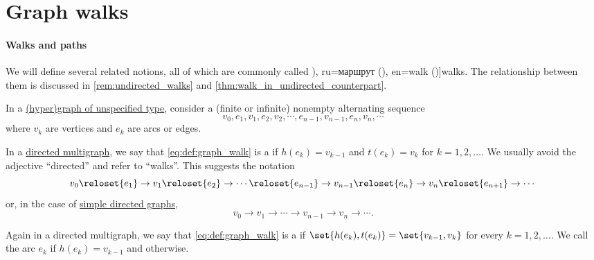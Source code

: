 \section{Graph walks}\label{sec:graph_walks}

\paragraph{Walks and paths}

\begin{definition}\label{def:graph_walk}\mimprovised
  We will define several related notions, all of which are commonly called \term[bg=маршрут (\cite[11]{Мирчев2001Графи}), ru=маршрут (\cite[23]{ЕмеличевИПр1990ТеорияГрафов}), en=walk (\cite[10]{Diestel2017GraphTheory})]{walks}. The relationship between them is discussed in \cref{rem:undirected_walks} and \cref{thm:walk_in_undirected_counterpart}.

  In a \hyperref[rem:graph_of_unspecified_type]{(hyper)graph of unspecified type}, consider a (finite or infinite) nonempty alternating sequence
  \begin{equation}\label{eq:def:graph_walk}
    v_0, e_1, v_1, e_2, v_2, \cdots, e_{n-1}, v_{n-1}, e_n, v_n, \cdots
  \end{equation}
  where \( v_k \) are vertices and \( e_k \) are arcs or edges.

  \begin{thmenum}[series=def:graph_walk]
     In a \hyperref[def:directed_multigraph]{directed multigraph}, we say that \eqref{eq:def:graph_walk} is a  if \( h(e_k) = v_{k-1} \) and \( t(e_k) = v_k \) for \( k = 1, 2, \ldots \). We usually avoid the adjective \enquote{directed} and refer to \enquote{walks}. This suggests the notation
    \begin{equation}\label{eq:def:graph_walk/directed}
      v_0 \reloset {e_1} \to v_1 \reloset {e_2} \to \cdots \reloset {e_{n-1}} \to v_{n-1} \reloset {e_n} \to v_n \reloset {e_{n+1}} \to \cdots
    \end{equation}
    or, in the case of \hyperref[def:directed_graph]{simple directed graphs},
    \begin{equation*}
      v_0 \to v_1 \to \cdots \to v_{n-1} \to v_n \to \cdots.
    \end{equation*}

     Again in a directed multigraph, we say that \eqref{eq:def:graph_walk} is a  if \( \set{ h(e_k), t(e_k) } = \set{ v_{k-1}, v_k } \) for every \( k = 1, 2, \ldots \). We call the arc \( e_k \)  if \( h(e_k) = v_{k-1} \) and  otherwise.


\end{thmenum}
\end{definition}
